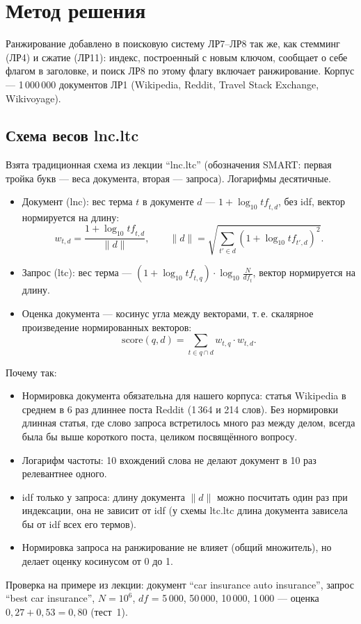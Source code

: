 \pagebreak
\section{Метод решения}
Ранжирование добавлено в поисковую систему ЛР7--ЛР8 так же, как стемминг (ЛР4) и сжатие (ЛР11): индекс, построенный с новым ключом, сообщает о себе флагом в заголовке, и поиск ЛР8 по этому флагу включает ранжирование. Корпус --- 1\,000\,000 документов ЛР1 (Wikipedia, Reddit, Travel Stack Exchange, Wikivoyage).

\subsection{Схема весов lnc.ltc}
Взята традиционная схема из лекции \enquote{lnc.ltc} (обозначения SMART: первая тройка букв --- веса документа, вторая --- запроса). Логарифмы десятичные.
\begin{itemize}
    \item Документ (lnc): вес терма $t$ в документе $d$ --- $1 + \log_{10} \mathit{tf}_{t,d}$, без idf, вектор нормируется на длину:
    $$w_{t,d} = \frac{1 + \log_{10} \mathit{tf}_{t,d}}{\|d\|}, \qquad \|d\| = \sqrt{\sum_{t' \in d} (1 + \log_{10} \mathit{tf}_{t',d})^2}.$$
    \item Запрос (ltc): вес терма --- $(1 + \log_{10} \mathit{tf}_{t,q}) \cdot \log_{10} \frac{N}{\mathit{df}_t}$, вектор нормируется на длину.
    \item Оценка документа --- косинус угла между векторами, т.\,е. скалярное произведение нормированных векторов:
    $$\mathrm{score}(q, d) = \sum_{t \in q \cap d} w_{t,q} \cdot w_{t,d}.$$
\end{itemize}
Почему так:
\begin{itemize}
    \item Нормировка документа обязательна для нашего корпуса: статья Wikipedia в среднем в 6 раз длиннее поста Reddit (1\,364 и 214 слов). Без нормировки длинная статья, где слово запроса встретилось много раз между делом, всегда была бы выше короткого поста, целиком посвящённого вопросу.
    \item Логарифм частоты: 10 вхождений слова не делают документ в 10 раз релевантнее одного.
    \item idf только у запроса: длину документа $\|d\|$ можно посчитать один раз при индексации, она не зависит от idf (у схемы ltc.ltc длина документа зависела бы от idf всех его термов).
    \item Нормировка запроса на ранжирование не влияет (общий множитель), но делает оценку косинусом от 0 до 1.
\end{itemize}
Проверка на примере из лекции: документ \enquote{car insurance auto insurance}, запрос \enquote{best car insurance}, $N = 10^6$, $\mathit{df}$ = 5\,000, 50\,000, 10\,000, 1\,000 --- оценка $0{,}27 + 0{,}53 = 0{,}80$ (тест~1).

